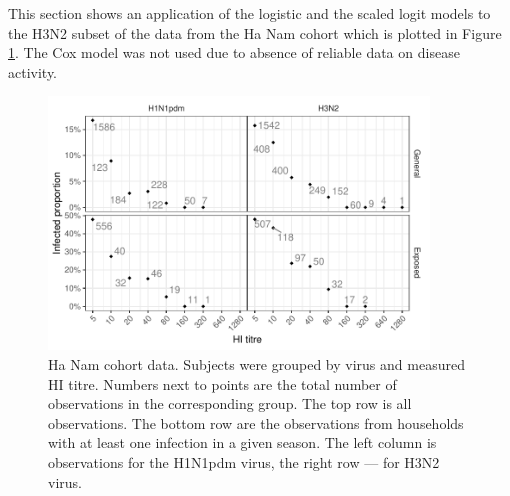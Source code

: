 This section shows an application of the logistic and the scaled logit models to the H3N2 subset of the data from the Ha Nam cohort which is plotted in Figure \ref{HanamCounts}. The Cox model was not used due to absence of reliable data on disease activity.

\begin{figure}[htp]
	\centering
	\includegraphics[width=0.9\textwidth]{../data-plot/hanam-hi-summ-light.pdf}
	\caption{
		Ha Nam cohort data. Subjects were grouped by virus and measured HI titre. Numbers next to points are the total number of observations in the corresponding group. The top row is all observations. The bottom row are the observations from households with at least one infection in a given season. The left column is observations for the H1N1pdm virus, the right row --- for H3N2 virus.
	}
	\label{HanamCounts}
\end{figure}
